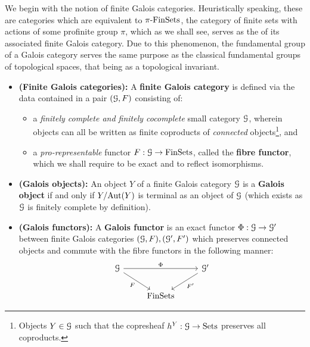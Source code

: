                 We begin with the notion of finite Galois categories. Heuristically speaking, these are categories which are equivalent to $\pi\text{-}\mathrm{Fin}\mathrm{Sets}$, the category of finite sets with actions of some profinite group $\pi$, which as we shall see, serves as the  of its associated finite Galois category. Due to this phenomenon, the fundamental group of a Galois category serves the same purpose as the classical fundamental groups of topological spaces, that being as a topological invariant. 
                \begin{definition} \label{def: finite_galois_categories}
                    \noindent
                    \begin{itemize}
                        \item \textbf{(Finite Galois categories):} A \textbf{finite Galois category} is defined via the data contained in a pair $(\mathcal{G}, F)$ consisting of:
                        \begin{itemize}
                            \item a \textit{finitely complete and finitely cocomplete} small category $\mathcal{G}$, wherein objects can all be written as finite coproducts of \textit{connected} objects\footnote{Objects $Y \in \mathcal{G}$ such that the copresheaf $h^Y: \mathcal{G} \to \mathrm{Sets}$ preserves all coproducts.}, and
                            \item a \textit{pro-representable} functor $F: \mathcal{G} \to \mathrm{Fin}\mathrm{Sets}$, called the \textbf{fibre functor}, which we shall require to be exact and to reflect isomorphisms.
                        \end{itemize}
                        \item \textbf{(Galois objects):} An object $Y$ of a finite Galois category $\mathcal{G}$ is a \textbf{Galois object} if and only if $Y/\mathrm{Aut}(Y)$ is terminal as an object of $\mathcal{G}$ (which exists as $\mathcal{G}$ is finitely complete by definition).
                        \item \textbf{(Galois functors):} A \textbf{Galois functor} is an exact functor $\Phi: \mathcal{G} \to \mathcal{G}'$ between finite Galois categories $(\mathcal{G}, F), (\mathcal{G}', F')$ which preserves connected objects and commute with the fibre functors in the following manner:
                            $$
                                \begin{tikzcd}
                                	\calG && {\calG'} \\
                                	& \Fin\Sets
                                	\arrow["F"', from=1-1, to=2-2]
                                	\arrow["{F'}", from=1-3, to=2-2]
                                	\arrow["\Phi", from=1-1, to=1-3]
                                \end{tikzcd}
                            $$
                    \end{itemize}
                \end{definition}
